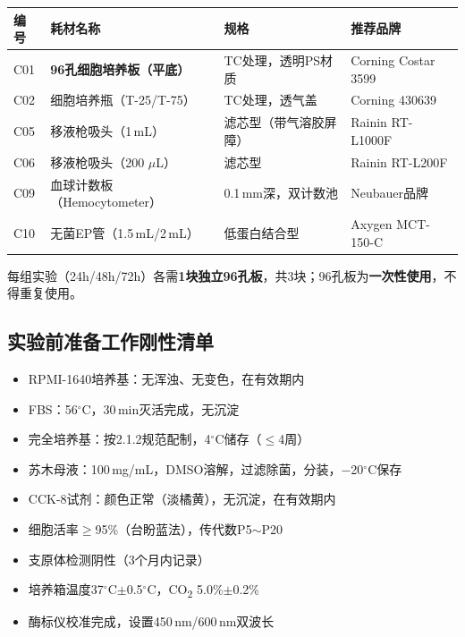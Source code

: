 \documentclass[12pt,a4paper]{article}
\newcommand{\degC}{$^\circ$C}
\newcommand{\uul}{\,$\mu$L}
\begin{document}
\begin{center}
\begin{tabular}{llll}
\toprule
\rowcolor{tabheadbg}\color{white}\textbf{编号} & \color{white}\textbf{耗材名称} & \color{white}\textbf{规格} & \color{white}\textbf{推荐品牌} \\
\midrule
C01 & \textbf{96孔细胞培养板（平底）} & TC处理，透明PS材质 & Corning Costar 3599 \\
C02 & 细胞培养瓶（T-25/T-75）& TC处理，透气盖 & Corning 430639 \\
C05 & 移液枪吸头（1\,mL）& 滤芯型（带气溶胶屏障）& Rainin RT-L1000F \\
C06 & 移液枪吸头（200\,\uul{}）& 滤芯型 & Rainin RT-L200F \\
C09 & 血球计数板（Hemocytometer）& 0.1\,mm深，双计数池 & Neubauer品牌 \\
C10 & 无菌EP管（1.5\,mL/2\,mL）& 低蛋白结合型 & Axygen MCT-150-C \\
\bottomrule
\end{tabular}
\end{center}

\begin{notebox}
每组实验（24h/48h/72h）各需\textbf{1块独立96孔板}，共3块；96孔板为\textbf{一次性使用}，不得重复使用。
\end{notebox}

\subsection{实验前准备工作刚性清单}

\begin{checklistbox}[title={实验前刚性验收清单（全部打勾方可启动实验）}]
\begin{itemize}
\item[$\square$] RPMI-1640培养基：无浑浊、无变色，在有效期内
\item[$\square$] FBS：56\degC{}，30\,min灭活完成，无沉淀
\item[$\square$] 完全培养基：按2.1.2规范配制，4\degC{}储存（$\leq$4周）
\item[$\square$] 苏木母液：100\,mg/mL，DMSO溶解，过滤除菌，分装，$-$20\degC{}保存
\item[$\square$] CCK-8试剂：颜色正常（淡橘黄），无沉淀，在有效期内
\item[$\square$] 细胞活率$\geq$95\%（台盼蓝法），传代数P5$\sim$P20
\item[$\square$] 支原体检测阴性（3个月内记录）
\item[$\square$] 培养箱温度37\degC{}$\pm$0.5\degC{}，CO\textsubscript{2} 5.0\%$\pm$0.2\%
\item[$\square$] 酶标仪校准完成，设置450\,nm/600\,nm双波长
\end{itemize}
\end{checklistbox}
\end{document}
